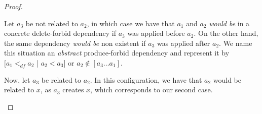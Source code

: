 \begin{proof}
\begin{description}[style=nextline,leftmargin=*]
    Let $a_3$ be not related to $a_2$, in which case we have that $a_1$ and $a_2$ \emph{would be} in a concrete delete-forbid dependency if $a_3$ was applied before $a_2$. On the other hand, the same dependency \emph{would be} non existent if $a_3$ was applied after $a_2$. We name this situation an \emph{abstract} produce-forbid dependency and represent it by $[a_1 <_{df} a_2$ | $a_2 < a_3]$ or $a_2 \not\in [a_3 \ldots a_1]$.


Now, let $a_3$ be related to $a_2$. In this configuration, we have that $a_2$ would be related to $x$, as $a_3$ creates $x$, which corresponds to our second case.
\end{description}
\end{proof}

